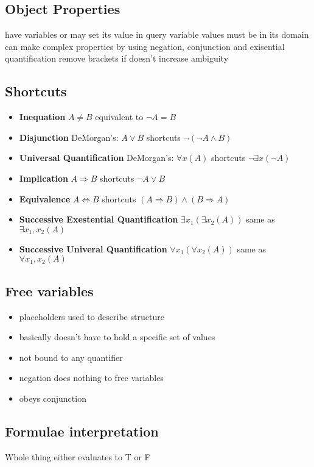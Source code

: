 \documentclass{article}
\newcommand\tab[1][0.5cm]{\hspace*{#1}}
\begin{document}
	\subsection{Object Properties}
		have variables or may set its value in query
		variable values must be in its domain
		can make complex properties by using negation, conjunction and exisential quantification
		remove brackets if doesn't increase ambiguity

	\subsection{Shortcuts}
		\begin{itemize}
			\item \textbf{Inequation} $A \neq B$ equivalent to $\neg A = B$
			\item \textbf{Disjunction} DeMorgan's: $A \vee B$ shortcuts $\neg(\neg A \wedge B)$
			\item \textbf{Universal Quantification} DeMorgan's: $\forall x (A)$ shortcuts $\neg \exists x (\neg A)$
			\item \textbf{Implication} $A \Rightarrow B $ shortcuts $ \neg A \vee B$
			\item \textbf{Equivalence} $A \Leftrightarrow B$ shortcuts $(A\Rightarrow B) \wedge (B \Rightarrow A)$ 
			\item \textbf{Successive Exestential Quantification} $\exists x_1 ( \exists x_2 (A))$ same as $\exists x_1,x_2(A)$
			\item \textbf{Successive Univeral Quantification} $\forall x_1 ( \forall x_2 (A))$ same as $\forall x_1,x_2(A)$
		\end{itemize}

	\subsection{Free variables}
		\begin{itemize}
			\item placeholders used to describe structure
			\item basically doesn't have to hold a specific set of values
			\item not bound to any quantifier
			\item negation does nothing to free variables
			\item obeys conjunction
		\end{itemize}

	\subsection{Formulae interpretation}
		\tab Whole thing either evaluates to T or F
\end{document}
